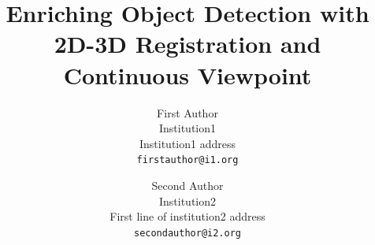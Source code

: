 \documentclass[10pt,twocolumn,letterpaper]{article}
\begin{document}
\title{Enriching Object Detection with 2D-3D Registration and Continuous Viewpoint}

\author{First Author\\
Institution1\\
Institution1 address\\
{\tt\small firstauthor@i1.org}
\and
Second Author\\
Institution2\\
First line of institution2 address\\
{\tt\small secondauthor@i2.org}
}

\maketitle
\end{document}
